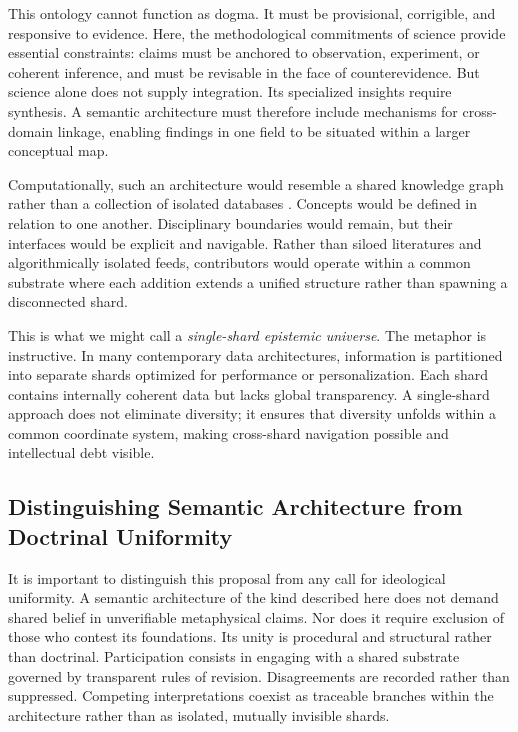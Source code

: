 \documentclass[11pt]{article}
\begin{document}
This ontology cannot function as dogma. It must be provisional, corrigible, and responsive to evidence. Here, the methodological commitments of science provide essential constraints: claims must be anchored to observation, experiment, or coherent inference, and must be revisable in the face of counterevidence. But science alone does not supply integration. Its specialized insights require synthesis. A semantic architecture must therefore include mechanisms for cross-domain linkage, enabling findings in one field to be situated within a larger conceptual map.

Computationally, such an architecture would resemble a shared knowledge graph rather than a collection of isolated databases \citep{HoganEtAl2021}. Concepts would be defined in relation to one another. Disciplinary boundaries would remain, but their interfaces would be explicit and navigable. Rather than siloed literatures and algorithmically isolated feeds, contributors would operate within a common substrate where each addition extends a unified structure rather than spawning a disconnected shard.

This is what we might call a \emph{single-shard epistemic universe}. The metaphor is instructive. In many contemporary data architectures, information is partitioned into separate shards optimized for performance or personalization. Each shard contains internally coherent data but lacks global transparency. A single-shard approach does not eliminate diversity; it ensures that diversity unfolds within a common coordinate system, making cross-shard navigation possible and intellectual debt visible.

\subsection{Distinguishing Semantic Architecture from Doctrinal Uniformity}

It is important to distinguish this proposal from any call for ideological uniformity. A semantic architecture of the kind described here does not demand shared belief in unverifiable metaphysical claims. Nor does it require exclusion of those who contest its foundations. Its unity is procedural and structural rather than doctrinal. Participation consists in engaging with a shared substrate governed by transparent rules of revision. Disagreements are recorded rather than suppressed. Competing interpretations coexist as traceable branches within the architecture rather than as isolated, mutually invisible shards.
\end{document}
